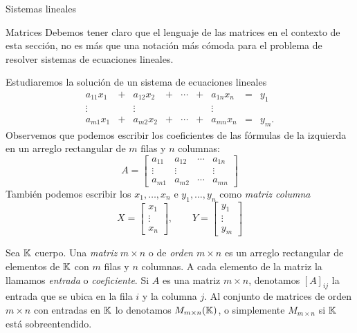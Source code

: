 \begin{chapter}{Sistemas lineales}
\begin{section}{Matrices}
            Debemos tener claro que el lenguaje de las matrices en el contexto de esta sección, no es más que una notación más cómoda para el problema de resolver sistemas de ecuaciones lineales.  
            
            Estudiaremos la solución de un sistema de ecuaciones lineales 
            \begin{equation}\label{sist-eq-hom}
            \begin{matrix}
            a_{11}x_1& + &a_{12}x_2& + &\cdots& + &a_{1n}x_n &= &y_1\\
            \vdots&  &\vdots& &&  &\vdots \\
            a_{m1}x_1& + &a_{m2}x_2& + &\cdots& + &a_{mn}x_n &=&y_m.
            \end{matrix}
            \end{equation}
            Observemos que podemos escribir los coeficientes de  las fórmulas de la izquierda en  un arreglo rectangular de $m$ filas y $n$ columnas:
            \begin{equation}\label{matriz}
            A = \begin{bmatrix}
            a_{11}& a_{12}& \cdots &a_{1n} \\
            \vdots&\vdots  &  &\vdots \\
            a_{m1} &a_{m2}&\cdots &a_{mn}
            \end{bmatrix}
            \end{equation} 
            También  podemos escribir los $x_1,\ldots,x_n$ e $y_1,\ldots,y_n$ como \textit{matriz columna}
            \begin{equation}\label{matriz-columna}
            X = \begin{bmatrix}
            x_1 \\
            \vdots \\
            x_{n}
            \end{bmatrix}, \qquad
            Y = \begin{bmatrix}
            y_1 \\
            \vdots \\
            y_{m}
            \end{bmatrix}
            \end{equation}
            
            
            \begin{definicion} Sea $\mathbb K$ cuerpo. Una \textit{matriz} $m \times  n$ o de \textit{orden $m \times  n$} es un arreglo rectangular de elementos de $\mathbb K$ con $m$ filas y $n$ columnas. A cada elemento de la matriz la llamamos \textit{entrada} o \textit{coeficiente}. Si $A$ es una matriz $m \times  n$, denotamos $[A]_{ij}$ la entrada que se ubica en la fila $i$ y la columna $j$. Al conjunto de matrices de orden $m \times  n$ con entradas en $\mathbb K$ lo denotamos $M_{m\times n}(\mathbb K)$, o simplemente $M_{m\times n}$ si $\mathbb K$  está sobreentendido. 
            \end{definicion}
            

\end{section}
\end{chapter}
